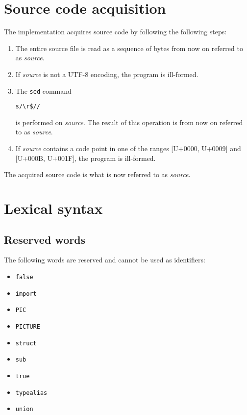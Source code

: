 \documentclass[12pt, oneside]{memoir}
\newcommand{\var}[1]{\emph{#1}}
\newcommand{\cp}[1]{U+#1}
\begin{document}
\chapter{Source code acquisition}

The implementation acquires source code by following the following steps:

\begin{enumerate}
  \item The entire source file is read as a sequence of bytes from now on
        referred to as \var{source}.
  \item If \var{source} is not a UTF-8 encoding, the program is ill-formed.
  \item The \texttt{sed} command
\begin{verbatim}
s/\r$//
\end{verbatim}
        is performed on \var{source}. The result of this operation is from now
        on referred to as \var{source}.
  \item If \var{source} contains a code point in one of the ranges
        [\cp{0000}, \cp{0009}] and [\cp{000B}, \cp{001F}], the program is
        ill-formed.
\end{enumerate}

The acquired source code is what is now referred to as \var{source}.

\chapter{Lexical syntax}

\section{Reserved words}

The following words are reserved and cannot be used as identifiers:

\begin{itemize}
  \item \texttt{false}
  \item \texttt{import}
  \item \texttt{PIC}
  \item \texttt{PICTURE}
  \item \texttt{struct}
  \item \texttt{sub}
  \item \texttt{true}
  \item \texttt{typealias}
  \item \texttt{union}
\end{itemize}
\end{document}
